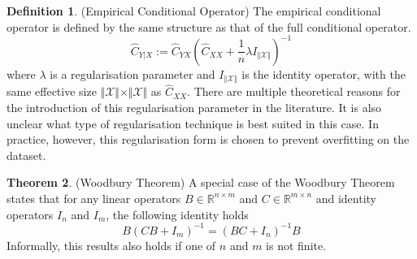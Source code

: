 \documentclass[twoside]{article} \usepackage{aistats2017}
\theoremstyle{definition}
\newtheorem{theorem}{Theorem}[section]
\newtheorem{definition}[theorem]{Definition}
\newcommand{\rv}[1]{{#1}}
\newcommand{\hatCyx}{\hat{C}_{\rv{Y} \rv{X}}}
\newcommand{\hatCxx}{\hat{C}_{\rv{X} \rv{X}}}
\newcommand{\hatCylx}{\hat{C}_{\rv{Y} | \rv{X}}}
\newcommand{\cardX}{\Vert \mathcal{X} \Vert}
\begin{document}
		\begin{definition} \label{def:empirical_conditional_operator}
			(Empirical Conditional Operator)
			The empirical conditional operator is defined by the same structure as that of the full conditional operator.
			\begin{equation}
				\hatCylx := \hatCyx (\hatCxx + \frac{1}{n} \lambda I_{\cardX})^{-1}
			\label{eq:empirical_conditional_operator_cross_cov}
			\end{equation}
			where $\lambda$ is a regularisation parameter and $I_{\cardX}$ is the identity operator, with the same effective size $\cardX \times \cardX$ as $\hatCxx$. There are multiple theoretical reasons for the introduction of this regularisation parameter in the literature. It is also unclear what type of regularisation technique is best suited in this case. In practice, however, this regularisation form is chosen to prevent overfitting on the dataset.
		\end{definition}
		
		\begin{theorem} \label{thm:woodbury}
			(Woodbury Theorem)
			A special case of the Woodbury Theorem states that for any linear operators $B \in \mathbb{R}^{n \times m}$ and $C \in \mathbb{R}^{m \times n}$ and identity operators $I_{n}$ and $I_{m}$, the following identity holds
			\begin{equation}
				B (CB + I_{m})^{-1} = (BC + I_{n})^{-1} B
			\label{eq:woodbury}
			\end{equation}
			Informally, this results also holds if one of $n$ and $m$ is not finite.
		\end{theorem}
		
\end{document}
